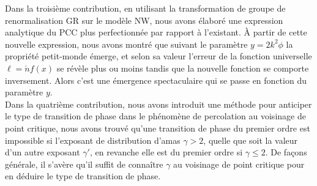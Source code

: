 Dans la troisième contribution, en utilisant la transformation de groupe de renormalisation GR sur le modèle NW, nous avons élaboré une expression analytique du PCC plus perfectionnée par rapport à l'existant. \`{A} partir de cette nouvelle expression, nous avons montré  que suivant le paramètre $y=2k^2\phi$ la propriété petit-monde émerge, et selon sa valeur l'erreur de la fonction universelle $\ell=\acute{n}f(x)$ se révèle plus ou moins tandis que la nouvelle fonction se comporte inversement. Alors c'est une émergence spectaculaire qui se passe en fonction du paramètre $y$.\\

Dans la quatrième contribution, nous avons introduit une méthode pour anticiper  le type de transition de phase dans le phénomène de percolation au voisinage de point critique, nous avons trouvé qu'une transition de phase du premier ordre est impossible si l'exposant de distribution d'amas $\gamma>2$, quelle que soit la valeur d'un autre exposant $\gamma'$, en revanche elle est du premier ordre si $\gamma\leq2$. De façons générale, il s'avère qu'il suffit de connaître $\gamma$ au voisinage de point critique pour en déduire le type de transition de phase.\\  
